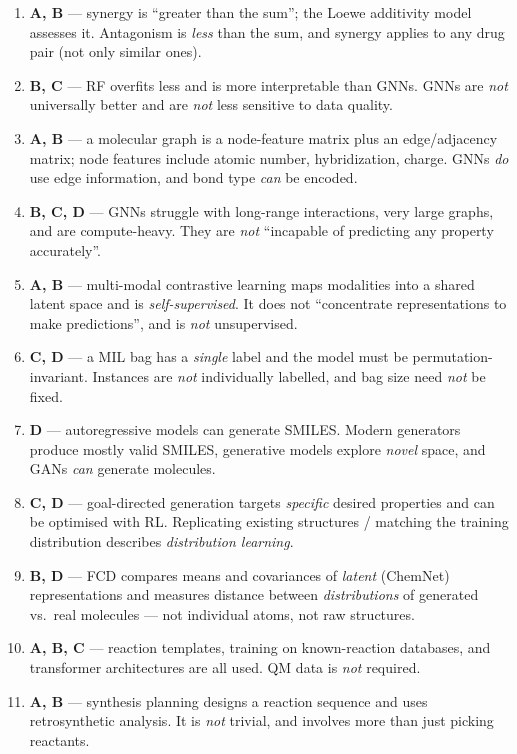 \documentclass[11pt,oneside]{article}
\begin{document}
\begin{enumerate}[label=\textbf{Q\arabic*.}, leftmargin=3em, itemsep=4pt]
  \item \textbf{A, B} --- synergy is ``greater than the sum''; the Loewe additivity model assesses it. Antagonism is \emph{less} than the sum, and synergy applies to any drug pair (not only similar ones).
  \item \textbf{B, C} --- RF overfits less and is more interpretable than GNNs. GNNs are \emph{not} universally better and are \emph{not} less sensitive to data quality.
  \item \textbf{A, B} --- a molecular graph is a node-feature matrix plus an edge/adjacency matrix; node features include atomic number, hybridization, charge. GNNs \emph{do} use edge information, and bond type \emph{can} be encoded.
  \item \textbf{B, C, D} --- GNNs struggle with long-range interactions, very large graphs, and are compute-heavy. They are \emph{not} ``incapable of predicting any property accurately''.
  \item \textbf{A, B} --- multi-modal contrastive learning maps modalities into a shared latent space and is \emph{self-supervised}. It does not ``concentrate representations to make predictions'', and is \emph{not} unsupervised.
  \item \textbf{C, D} --- a MIL bag has a \emph{single} label and the model must be permutation-invariant. Instances are \emph{not} individually labelled, and bag size need \emph{not} be fixed.
  \item \textbf{D} --- autoregressive models can generate SMILES. Modern generators produce mostly valid SMILES, generative models explore \emph{novel} space, and GANs \emph{can} generate molecules.
  \item \textbf{C, D} --- goal-directed generation targets \emph{specific} desired properties and can be optimised with RL. Replicating existing structures / matching the training distribution describes \emph{distribution learning}.
  \item \textbf{B, D} --- FCD compares means and covariances of \emph{latent} (ChemNet) representations and measures distance between \emph{distributions} of generated vs.\ real molecules --- not individual atoms, not raw structures.
  \item \textbf{A, B, C} --- reaction templates, training on known-reaction databases, and transformer architectures are all used. QM data is \emph{not} required.
  \item \textbf{A, B} --- synthesis planning designs a reaction sequence and uses retrosynthetic analysis. It is \emph{not} trivial, and involves more than just picking reactants.

\end{enumerate}
\end{document}
